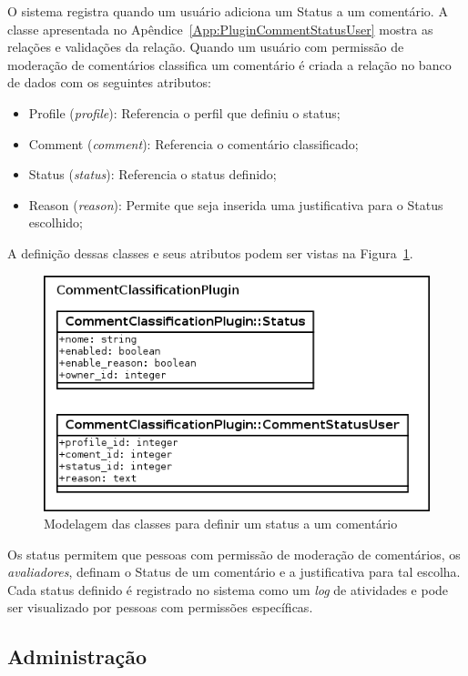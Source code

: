 \documentclass[11pt]{article}
\begin{document}
O sistema registra quando um usuário adiciona um Status a um
comentário. A classe apresentada no
Apêndice~\ref{App:PluginCommentStatusUser} mostra as relações e
validações da relação. Quando um usuário com permissão de moderação de
comentários classifica um comentário é criada a relação no banco de
dados com os seguintes atributos:
\begin{itemize}
  \item Profile ({\it profile}): Referencia o perfil que definiu o
status;
  \item Comment ({\it comment}): Referencia o comentário classificado;
  \item Status ({\it status}): Referencia o status definido;
  \item Reason ({\it reason}): Permite que seja inserida uma
justificativa para o Status escolhido;
\end{itemize}

A definição dessas classes e seus atributos podem ser vistas na
Figura~\ref{fig:status-model}.

\begin{figure}[h]
\center
\includegraphics[scale=0.6]{status-model.png}
\caption{Modelagem das classes para definir um status a um comentário}
\label{fig:status-model}
\end{figure}

Os status permitem que pessoas com permissão de moderação de
comentários, os {\it avaliadores}, definam o Status de um comentário e a
justificativa para tal escolha. Cada status definido é registrado no
sistema como um {\it log} de atividades e pode ser visualizado por
pessoas com permissões específicas.

\subsection{Administração}
\end{document}
